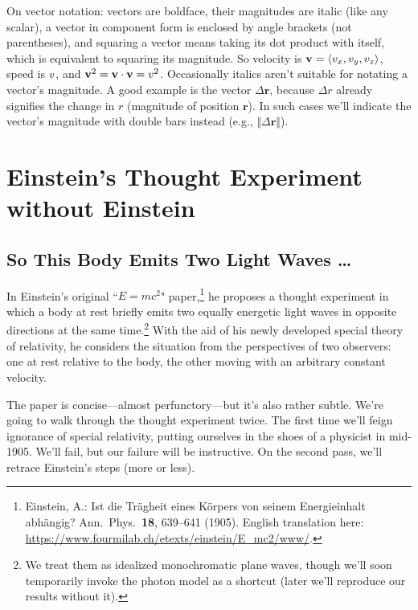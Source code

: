\documentclass[12pt]{article}
\newcommand{\abs}[1]{\mathnormal \vv{#1}}
\renewcommand{\vv}[1]{\mathbf{#1}}
\begin{document}
On vector notation: vectors are boldface, their magnitudes are italic (like any scalar), a vector in component form is enclosed by angle brackets (not parentheses), and squaring a vector means taking its dot product with itself, which is equivalent to squaring its magnitude. So velocity is $\vv v = \langle \abs v_x, \abs v_y, \abs v_z \rangle$, speed is $\abs v$, and $\vv v^2 = \vv v \cdot \vv v =  \abs v^2$. Occasionally italics aren't suitable for notating a vector's magnitude. A good example is the vector $\Delta \vv r$, because $\Delta r$ already signifies the change in $r$ (magnitude of position $\vv r$). In such cases we'll indicate the vector's magnitude with double bars instead (e.g., $\Vert \Delta \vv r \Vert$).


\section[Einstein's Thought Experiment without Einstein]{Einstein's Thought Experiment\\without Einstein}
 
\subsection{So This Body Emits Two Light Waves \ldots}
 
In Einstein's original ``$E=mc^2$" paper,\footnote{Einstein, A.: Ist die Tr\"agheit eines K\"orpers von seinem Energieinhalt abh\"angig? Ann.\ Phys.\ \textbf{18}, 639--641 (1905). English translation here: \url{https://www.fourmilab.ch/etexts/einstein/E_mc2/www/}.} he proposes a thought experiment in which a body at rest briefly emits two equally energetic light waves in opposite directions at the same time.\footnote{We treat them as idealized monochromatic plane waves, though we'll soon temporarily invoke the photon model as a shortcut (later we'll reproduce our results without it).} With the aid of his newly developed special theory of relativity, he considers the situation from the perspectives of two observers: one at rest relative to the body, the other moving with an arbitrary constant velocity.
 
The paper is concise---almost perfunctory---but it's also rather subtle. We're going to walk through the thought experiment twice. The first time we'll feign ignorance of special relativity, putting ourselves in the shoes of a physicist in mid-1905. We'll fail, but our failure will be instructive. On the second pass, we'll retrace Einstein's steps (more or less).
\end{document}
